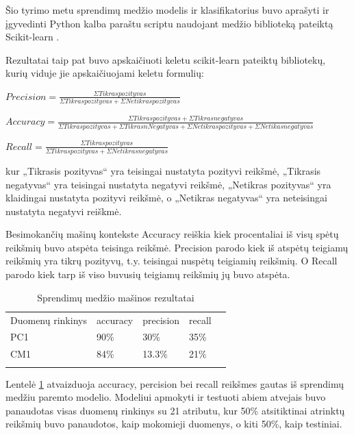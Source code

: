 \documentclass{VUMIFPSbakalaurinis}
\begin{document}
Šio tyrimo metu sprendimų medžio modelis ir klasifikatorius buvo aprašyti ir įgyvedinti Python kalba paraštu scriptu naudojant medžio biblioteką pateiktą Scikit-learn \cite{scikit-learn}.

Rezultatai taip pat buvo apskaičiuoti keletu scikit-learn pateiktų bibliotekų, kurių viduje jie apskaičiuojami keletu formulių:
\begin{description} 
\item \(Precision = \frac{\Sigma Tikras pozityvas}{\Sigma Tikras pozityvas + \Sigma Netikras pozityvas}\)
\item \(Accuracy = \frac{\Sigma Tikras pozityvas + \Sigma Tikras negatyvas}{\Sigma Tikras pozityvas  + \Sigma Tikras nNegatyvas + \Sigma Netikras pozityvas + \Sigma Netikas negatyvas}\)
\item \(Recall = \frac{\Sigma Tikras pozityvas}{\Sigma Tikras pozityvas + \Sigma Netikras negatyvas}\)
\end{description}
kur „Tikrasis pozityvas“ yra teisingai nustatyta pozityvi reikšmė, „Tikrasis negatyvas“ yra teisingai nustatyta negatyvi reikšmė, „Netikras pozityvas“ yra klaidingai nustatyta pozityvi reikšmė, o „Netikras negatyvas“ yra neteisingai nustatyta negatyvi reiškmė.

Besimokančių mašinų kontekste Accuracy reiškia kiek procentaliai iš visų spėtų reikšmių buvo atspėta teisinga reikšmė. Precision parodo kiek iš atspėtų teigiamų reikšmių yra tikrų pozityvų, t.y. teisingai nuspėtų teigiamių reikšmių. O Recall parodo kiek tarp iš viso buvusių teigiamų reikšmių jų buvo atspėta.

\begin{table}[H]\footnotesize
\centering
\caption{Sprendimų medžio mašinos rezultatai}
\label{tab:Tree_result}
\begin{tabular}{lllll}
\cline{1-4}
\multicolumn{1}{|l}{Duomenų rinkinys} & accuracy & precision & \multicolumn{1}{l|}{recall} &  \\ \cline{1-4}
\multicolumn{1}{|l}{PC1}              & 90\%   & 30\%     & \multicolumn{1}{l|}{35\%} &  \\
\multicolumn{1}{|l}{CM1}              & 84\%    & 13.3\%     & \multicolumn{1}{l|}{21\%}  &  \\ \cline{1-4}
                                      &          &           &                             & 
\end{tabular}
\end{table}

Lentelė \ref{tab:Tree_result} atvaizduoja accuracy, percision bei recall reikšmes gautas iš sprendimų medžiu paremto modelio. Modeliui apmokyti ir testuoti abiem atvejais buvo panaudotas visas duomenų rinkinys su 21 atributu, kur 50\% atsitiktinai atrinktų reikšmių buvo panaudotos, kaip mokomieji duomenys, o kiti 50\%, kaip testiniai.
\end{document}
